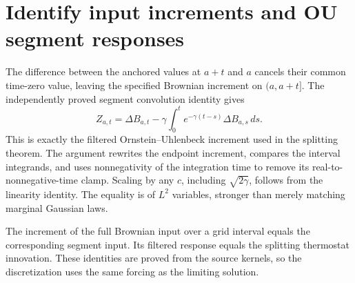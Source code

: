 \documentclass[11pt,a4paper]{article}
\begin{document}
\section{\texorpdfstring{Identify input increments and OU segment responses}{Identify input increments and OU segment responses}}


The difference between the anchored values at \(a+t\) and \(a\) cancels their common time-zero value, leaving the specified Brownian increment on \((a,a+t]\). The independently proved segment convolution identity gives \[Z_{a,t}=\Delta B_{a,t}-\gamma\int_0^t e^{-\gamma(t-s)}\Delta B_{a,s}\,ds.\] This is exactly the filtered Ornstein–Uhlenbeck increment used in the splitting theorem. The argument rewrites the endpoint increment, compares the interval integrands, and uses nonnegativity of the integration time to remove its real-to-nonnegative-time clamp. Scaling by any \(c\), including \(\sqrt{2\gamma}\), follows from the linearity identity. The equality is of \(L^{2}\) variables, stronger than merely matching marginal Gaussian laws.



The increment of the full Brownian input over a grid interval equals the corresponding segment input. Its filtered response equals the splitting thermostat innovation. These identities are proved from the source kernels, so the discretization uses the same forcing as the limiting solution.
\end{document}
